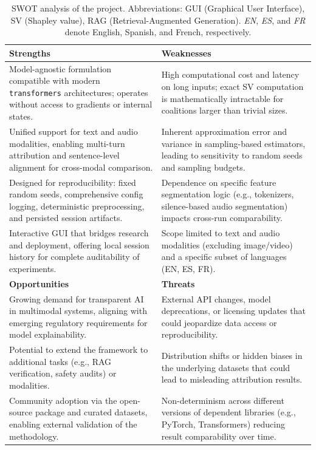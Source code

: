 \begin{appendices}
    \begin{table}[t!]
        \centering
        \small
        \caption{SWOT analysis of the project. Abbreviations: GUI (Graphical User Interface), SV (Shapley value), RAG (Retrieval-Augmented Generation). \textit{EN}, \textit{ES}, and \textit{FR} denote English, Spanish, and French, respectively.}
        \label{tab:risk_assessment__risk_overview__swot}
        \begin{tabularx}{\textwidth}{@{}XX@{}}
            \toprule
            \textbf{Strengths} & \textbf{Weaknesses} \\
            \midrule
            Model-agnostic formulation compatible with modern \texttt{transformers} architectures; operates without access to gradients or internal states. & High computational cost and latency on long inputs; exact SV computation is mathematically intractable for coalitions larger than trivial sizes. \\
            \addlinespace
            Unified support for text and audio modalities, enabling multi-turn attribution and sentence-level alignment for cross-modal comparison. & Inherent approximation error and variance in sampling-based estimators, leading to sensitivity to random seeds and sampling budgets. \\
            \addlinespace
            Designed for reproducibility: fixed random seeds, comprehensive config logging, deterministic preprocessing, and persisted session artifacts. & Dependence on specific feature segmentation logic (e.g., tokenizers, silence-based audio segmentation) impacts cross-run comparability. \\
            \addlinespace
            Interactive GUI that bridges research and deployment, offering local session history for complete auditability of experiments. & Scope limited to text and audio modalities (excluding image/video) and a specific subset of languages (EN, ES, FR). \\
            \midrule
            \textbf{Opportunities} & \textbf{Threats} \\
            \midrule
            Growing demand for transparent AI in multimodal systems, aligning with emerging regulatory requirements for model explainability. & External API changes, model deprecations, or licensing updates that could jeopardize data access or reproducibility. \\
            \addlinespace
            Potential to extend the framework to additional tasks (e.g., RAG verification, safety audits) or modalities. & Distribution shifts or hidden biases in the underlying datasets that could lead to misleading attribution results. \\
            \addlinespace
            Community adoption via the open-source package and curated datasets, enabling external validation of the methodology. & Non-determinism across different versions of dependent libraries (e.g., PyTorch, Transformers) reducing result comparability over time. \\
            \bottomrule
        \end{tabularx}
    \end{table}


\end{appendices}
